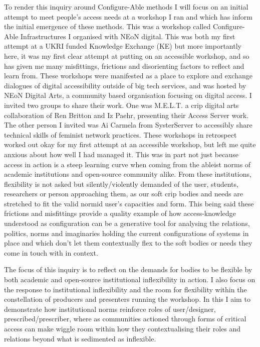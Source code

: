 To render this inquiry around Configure-Able methods I will focus on an
initial attempt to meet people's access needs at a workshop I ran and
which has inform the initial emergence of these methods. This was a
workshop called Configure-Able Infrastructures I organised with NEoN
digital. This was both my first attempt at a UKRI funded Knowledge
Exchange (KE) but more importantly here, it was my first clear attempt
at putting on an accessible workshop, and so has given me many
misfittings, frictions and disorienting factors to reflect and learn
from. These workshops were manifested as a place to explore and exchange
dialogues of digital accessibility outside of big tech services, and was
hosted by NEoN Digital Arts, a community based organisation focusing on
digital access. I invited two groups to share their work. One was
M.E.L.T. a crip digital arts collaboration of Ren Britton and Iz Paehr,
presenting their Access Server work. The other person I invited was Ai
Carmela from SysterServer to accessibly share technical skills of
feminist network practices. These workshops in retrospect worked out
okay for my first attempt at an accessible workshop, but left me quite
anxious about how well I had managed it. This was in part not just
because access in action is a steep learning curve when coming from the
ableist norms of academic institutions and open-source community alike.
From these institutions, flexibility is not asked but silently/violently
demanded of the user, students, researchers or person approaching them,
as our soft crip bodies and needs are stretched to fit the valid normid
user's capacities and form. This being said these frictions and
misfittings provide a quality example of how access-knowledge understood
as configuration can be a generative tool for analysing the relations,
politics, norms and imaginaries holding the current configurations of
systems in place and which don't let them contextually flex to the soft
bodies or needs they come in touch with in context.

The focus of this inquiry is to reflect on the demands for bodies to be
flexible by both academic and open-source institutional inflexibility in
action. I also focus on the response to institutional inflexibility and
the room for flexibility within the constellation of producers and
presenters running the workshop. In this I aim to demonstrate how
institutional norms reinforce roles of user/designer,
prescribed/prescriber, where as communities actioned through forms of
critical access can make wiggle room within how they contextualising
their roles and relations beyond what is sedimented as inflexible.

